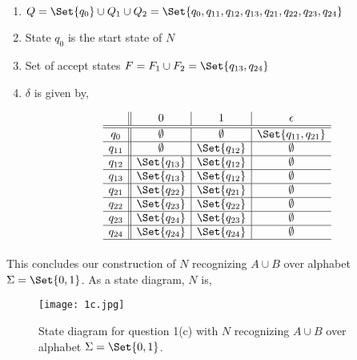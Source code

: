 \documentclass{article}
\begin{document}
\begin{enumerate}
    \item $Q = \Set{q_0} \cup Q_1 \cup Q_2 = \Set{q_0,q_{11},q_{12},q_{13},q_{21},q_{22},q_{23},q_{24}}$
    \item State $q_0$ is the start state of $N$
    \item Set of accept states $F = F_1 \cup F_2 = \Set{q_{13},q_{24}}$
    \item $\delta$ is given by,
    
\begin{figure}[H]
\centering

\[
\begin{array}{c||c|c|c}
         & 0 & 1 & \epsilon \\ \hline \hline 
        q_0 & \emptyset & \emptyset & \Set{q_{11},q_{21}} \\ \hline 
        q_{11} & \emptyset & \Set{q_{12}} & \emptyset \\ \hline 
        q_{12} & \Set{q_{13}} & \Set{q_{12}} & \emptyset \\ \hline 
        q_{13} & \Set{q_{13}} & \Set{q_{12}} & \emptyset \\ \hline 
        q_{21} & \Set{q_{22}} & \Set{q_{21}} & \emptyset \\ \hline 
        q_{22} & \Set{q_{23}} & \Set{q_{22}} & \emptyset \\ \hline 
        q_{23} & \Set{q_{24}} & \Set{q_{23}} & \emptyset \\ \hline 
        q_{24} & \Set{q_{24}} & \Set{q_{24}} & \emptyset \\ \hline 
\end{array}
\]

\caption{}
\label{fig:mylabel}
\end{figure}
    
\end{enumerate}

\paragraph{}

This concludes our construction of $N$ recognizing $A \cup B$ over alphabet $\Sigma = \Set{0,1}$.  As a state diagram, $N$ is,

\begin{figure}[H]
    \centering
    \texttt{[image: 1c.jpg]}
    \caption{State diagram for question 1(c) with $N$ recognizing $A \cup B$ over alphabet $\Sigma = \Set{0,1}$.}
    \label{fig:my_label}
\end{figure}
\end{document}
